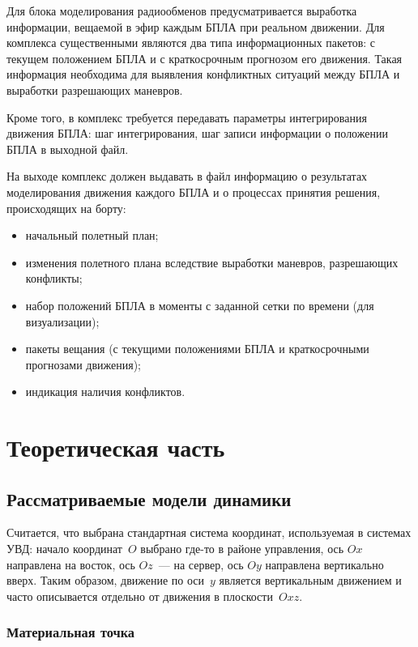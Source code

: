 \documentclass[a4paper,12pt]{article}
\begin{document}
Для блока моделирования радиообменов предусматривается выработка информации, вещаемой в эфир каждым БПЛА при реальном движении. Для комплекса существенными являются два типа информационных пакетов: с текущем положением БПЛА и с краткосрочным прогнозом его движения. Такая информация необходима для выявления конфликтных ситуаций между БПЛА и выработки разрешающих маневров.

Кроме того, в комплекс требуется передавать параметры интегрирования движения БПЛА: шаг интегрирования, шаг записи информации о положении БПЛА в выходной файл.

На выходе комплекс должен выдавать в файл информацию о результатах моделирования движения каждого БПЛА и о процессах принятия решения, происходящих на борту:
\begin{itemize}
  \item начальный полетный план;
  \item изменения полетного плана вследствие выработки маневров, разрешающих конфликты;
  \item набор положений БПЛА в моменты с заданной сетки по времени (для визуализации);
  \item пакеты вещания (с текущими положениями БПЛА и краткосрочными прогнозами движения);
  \item индикация наличия конфликтов.
\end{itemize}

\newpage



\section{Теоретическая часть}

\subsection{Рассматриваемые модели динамики}

Считается, что выбрана стандартная система координат, используемая в системах УВД: начало координат~$O$ выбрано где-то в районе управления, ось $Ox$ направлена на восток, ось $Oz$~--- на сервер, ось $Oy$ направлена вертикально вверх. Таким образом, движение по оси~$y$ является вертикальным движением и часто описывается отдельно от движения в плоскости~$Oxz$.


\subsubsection{Материальная точка}
\end{document}
